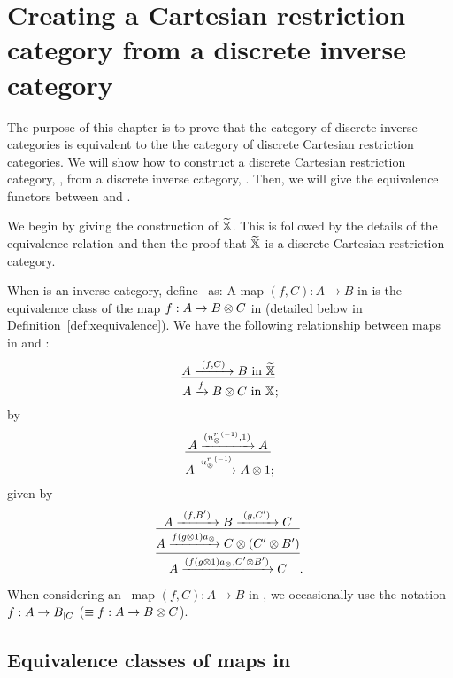 \chapter{Creating a Cartesian restriction category from a discrete inverse category} %
\label{chap:completing_a_discrete_inverse_category}

The purpose of this chapter is to prove that the category of discrete inverse categories is
equivalent to the the category of discrete Cartesian restriction categories. We will show
how to construct a discrete Cartesian restriction category, \Xt, from a discrete inverse
category, \X. Then, we will give the equivalence functors between \X and \Xt.

We begin by giving the construction of $\widetilde{\mathbb{X}}$. This is followed by the details of the equivalence
relation and then the proof that $\widetilde{\mathbb{X}}$ is a discrete Cartesian restriction category.

\begin{definition}\label{def:xt}
  When \X is an inverse category, define \Xt\ as:
  {
    A map $(f,C):A\to B$ in \Xt is the equivalence class of the map $f:A\to B\otimes C$ in \X (detailed below in
    Definition~\ref{def:xequivalence}). We have the following relationship between maps in \Xt and \X: %
    \[
      \infer{A\xrightarrow{f} B\*C \text{ in }\X}{A \xrightarrow{\ (f,C)\ } B \text{ in } \Xt};
    \]
  }
  {%
    by
    \[
      \infer{A\xrightarrow{\inv{u_{\*}^r}}A\* 1}
            {A \xrightarrow{(\inv{u_{\*}^r}, 1)} A};
    \]
  }
  {%
    given by
    \[
      \infer{
        \infer{A\xrightarrow{(f (g\*1) a_{\*},C' \* B')} C}
              {A\xrightarrow{f (g\*1) a_{\*}} C \* (C' \* B')}
            }
            {A \xrightarrow{\ (f,B')\ } B \xrightarrow{\ (g,C')\ } C}.
    \]
  }

\end{definition}

When considering an \Xt\ map $(f,C):A\to B$ in \X, we occasionally use the notation $f:A\to
{B}_{|{C}}$ ($\equiv f:A\to B\otimes C$).

\section{Equivalence classes of maps in \hypX} %
\label{sec:equivalence_classes_of_maps_in_hypx}


